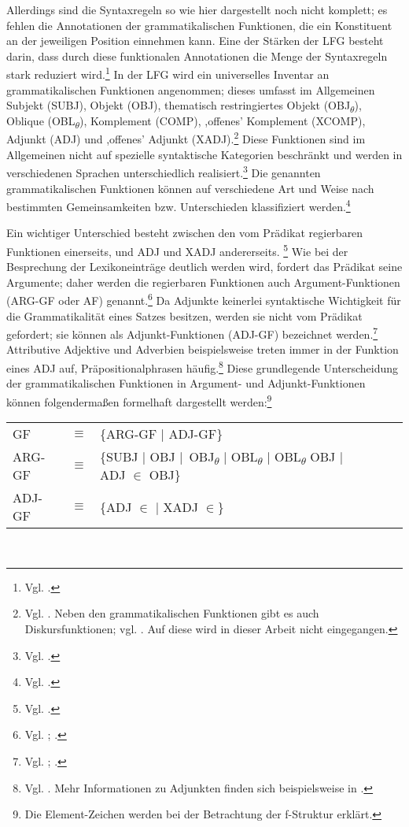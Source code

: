 \documentclass[12pt,a4paper]{article}
\begin{document}
Allerdings sind die Syntaxregeln so wie hier dargestellt noch nicht komplett; es fehlen die Annotationen der grammatikalischen Funktionen, die ein Konstituent an der jeweiligen Position einnehmen kann. Eine der Stärken der LFG besteht darin, dass durch diese funktionalen Annotationen die Menge der Syntaxregeln stark reduziert wird.\footnote{Vgl. \cite[45]{Dal}.} In der LFG wird ein universelles Inventar an grammatikalischen Funktionen angenommen; dieses umfasst im Allgemeinen Subjekt (SUBJ), Objekt (OBJ), thematisch restringiertes Objekt (OBJ\textsubscript{$\theta$}), Oblique (OBL\textsubscript{$\theta$}), Komplement (COMP), ,offenes' Komplement (XCOMP), Adjunkt (ADJ) und ,offenes' Adjunkt (XADJ).\footnote{Vgl. \cite[9]{Dal}. Neben den grammatikalischen Funktionen gibt es auch Diskursfunktionen; vgl. \cite[28; 76-84; 94-101]{Skript}. Auf diese wird in dieser Arbeit nicht eingegangen.} Diese Funktionen sind im Allgemeinen nicht auf spezielle syntaktische Kategorien beschränkt und werden in verschiedenen Sprachen unterschiedlich realisiert.\footnote{Vgl. \cite[9-10]{Bresnan}.} Die genannten grammatikalischen Funktionen können auf verschiedene Art und Weise nach bestimmten Gemeinsamkeiten bzw. Unterschieden klassifiziert werden.\footnote{Vgl. \cite[56-8]{Falk}.} 

Ein wichtiger Unterschied besteht zwischen den vom Prädikat regierbaren Funktionen einerseits, und ADJ und XADJ andererseits. \footnote{Vgl. \cite[56]{Falk}.} Wie bei der Besprechung der Lexikoneinträge deutlich werden wird, fordert das Prädikat seine Argumente; daher werden die regierbaren Funktionen auch Argument-Funktionen (ARG-GF oder AF) genannt.\footnote{Vgl. \cite[28]{Skript}; \cite[58]{Falk}.} Da Adjunkte keinerlei syntaktische Wichtigkeit für die Grammatikalität eines Satzes besitzen, werden sie nicht vom Prädikat gefordert; sie können als Adjunkt-Funktionen (ADJ-GF) bezeichnet werden.\footnote{Vgl. \cite[10-1]{Dal}; \cite[38]{Skript}.} Attributive Adjektive und Adverbien beispielsweise treten immer in der Funktion eines ADJ auf, Präpositionalphrasen häufig.\footnote{Vgl. \cite[38]{Skript}. Mehr Informationen zu Adjunkten finden sich beispielsweise in \cite[61-2]{Falk}.} Diese grundlegende Unterscheidung der grammatikalischen Funktionen in Argument- und Adjunkt-Funktionen können folgendermaßen formelhaft dargestellt werden:\footnote{Die Element-Zeichen werden bei der Betrachtung der f-Struktur erklärt.}

\begin{singlespace}
\begin{tabular}{ l  l  l  c  c  c  c }
GF & $\equiv$ & \{ARG-GF $\mid$ ADJ-GF\} \\
ARG-GF & $\equiv$ & \{SUBJ $\mid$ OBJ $\mid$\ OBJ\textsubscript{$\theta$} $\mid$ OBL\textsubscript{$\theta$} $\mid$ OBL\textsubscript{$\theta$} OBJ $\mid$ ADJ $\in$ OBJ\} \\
ADJ-GF & $\equiv$ & \{ADJ $\in$ $\mid$ XADJ $\in$\} \\
\end{tabular}\\
\end{singlespace}
\end{document}
